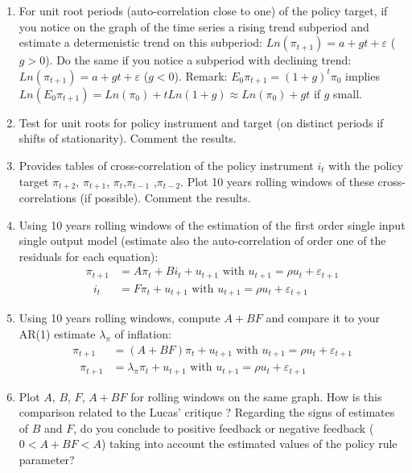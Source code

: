 \documentclass[12pt,a4paper]{article}%
\begin{document}
\begin{enumerate}
\item For unit root periods (auto-correlation close to one) of the policy
target, if you notice on the graph of the time series a rising trend subperiod
and estimate a determenistic trend on this subperiod: $Ln(\pi_{t+1}%
)=a+gt+\varepsilon$ ($g>0$). Do the same if you notice a subperiod with
declining trend: $Ln(\pi_{t+1})=a+gt+\varepsilon$ ($g<0$). Remark: $E_{0}%
\pi_{t+1}=\left(  1+g\right)  ^{t}\pi_{0}$ implies $Ln(E_{0}\pi_{t+1}%
)=Ln(\pi_{0})+tLn(1+g)\approx Ln(\pi_{0})+gt$ if $g$ small.

\item Test for unit roots for policy instrument and target (on distinct
periods if shifts of stationarity). Comment the results.

\item Provides tables of cross-correlation of the policy instrument $i_{t}$
with the policy target $\pi_{t+2}$, $\pi_{t+1}$, $\pi_{t}$,$\pi_{t-1}$%
,$\pi_{t-2}$. Plot 10 years rolling windows of these cross-correlations (if
possible). Comment the results.

\item Using 10 years rolling windows of the estimation of the first order
single input single output model (estimate also the auto-correlation of order
one of the residuals for each equation):%
\begin{align*}
\pi_{t+1} &  =A\pi_{t}+Bi_{t}+u_{t+1}\text{ with }u_{t+1}=\rho u_{t}%
+\varepsilon_{t+1}\\
\text{ }i_{t} &  =F\pi_{t}+u_{t+1}\text{ with }u_{t+1}=\rho u_{t}%
+\varepsilon_{t+1}%
\end{align*}


\item Using 10 years rolling windows, compute $A+BF$ and compare it to your
AR(1) estimate $\lambda_{\pi}$ of inflation:%
\begin{align*}
\pi_{t+1} &  =(A+BF)\pi_{t}+u_{t+1}\text{ with }u_{t+1}=\rho u_{t}%
+\varepsilon_{t+1}\\
\text{ }\pi_{t+1} &  =\lambda_{\pi}\pi_{t}+u_{t+1}\text{ with }u_{t+1}=\rho
u_{t}+\varepsilon_{t+1}%
\end{align*}


\item Plot $A$, $B$, $F$, $A+BF$ for rolling windows on the same graph. How is
this comparison related to the Lucas' critique ? Regarding the signs of
estimates of $B$ and $F$, do you conclude to positive feedback or negative
feedback ($0<A+BF<A$) taking into account the estimated values of the policy
rule parameter?


\end{enumerate}
\end{document}
